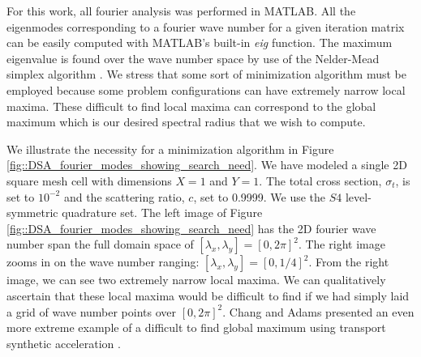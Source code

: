 For this work, all fourier analysis was performed in MATLAB. All the eigenmodes corresponding to a fourier wave number for a given iteration matrix can be easily computed with MATLAB's built-in {\em eig} function. The maximum eigenvalue is found over the wave number space by use of the Nelder-Mead simplex algorithm \cite{nelder1965simplex}. We stress that some sort of minimization algorithm must be employed because some problem configurations can have extremely narrow local maxima. These difficult to find local maxima can correspond to the global maximum which is our desired spectral radius that we wish to compute. 

We illustrate the necessity for a minimization algorithm in Figure \ref{fig::DSA_fourier_modes_showing_search_need}. We have modeled a single 2D square mesh cell with dimensions $X=1$ and $Y=1$. The total cross section, $\sigma_t$, is set to $10^{-2}$ and the scattering ratio, $c$, set to 0.9999. We use the $S4$ level-symmetric quadrature set. The left image of Figure \ref{fig::DSA_fourier_modes_showing_search_need} has the 2D fourier wave number span the full domain space of $[\lambda_x,\lambda_y]=[0,2 \pi]^2$. The right image zooms in on the wave number ranging: $[\lambda_x,\lambda_y]=[0,1/4]^2$. From the right image, we can see two extremely narrow local maxima. We can qualitatively ascertain that these local maxima would be difficult to find if we had simply laid a grid of wave number points over $[0,2 \pi]^2$. Chang and Adams presented an even more extreme example of a difficult to find global maximum using transport synthetic acceleration \cite{chang2003analysis}.

